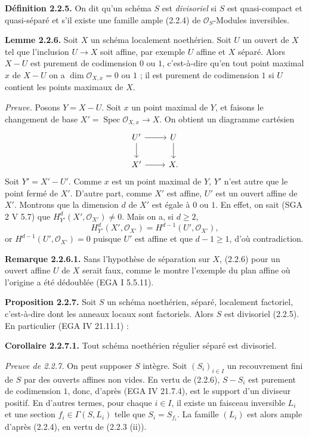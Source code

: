 \documentclass[11pt]{article}
\begin{document}
\textbf{Définition 2.2.5.} On dit qu'un schéma $S$ est \emph{divisoriel} si $S$ est quasi-compact et quasi-séparé et s'il existe une famille ample (2.2.4) de $\mathcal O_S$-Modules inversibles.

\textbf{Lemme 2.2.6.} Soit $X$ un schéma localement noethérien. Soit $U$ un ouvert de $X$ tel que l'inclusion $U\to X$ soit affine, par exemple $U$ affine et $X$ séparé. Alors $X-U$ est purement de codimension $0$ ou $1$, c'est-à-dire qu'en tout point maximal $x$ de $X-U$ on a $\dim\mathcal O_{X,x}=0$ ou $1$ ; il est purement de codimension $1$ si $U$ contient les points maximaux de $X$.

\emph{Preuve.} Posons $Y=X-U$. Soit $x$ un point maximal de $Y$, et faisons le changement de base $X'=\operatorname{Spec}\mathcal O_{X,x}\to X$. On obtient un diagramme cartésien
\[
\begin{tikzcd}
U' \arrow[r] \arrow[d] & U \arrow[d] \\
X' \arrow[r] & X .
\end{tikzcd}
\]
Soit $Y'=X'-U'$. Comme $x$ est un point maximal de $Y$, $Y'$ n'est autre que le point fermé de $X'$. D'autre part, comme $X'$ est affine, $U'$ est un ouvert affine de $X'$. Montrons que la dimension $d$ de $X'$ est égale à $0$ ou $1$. En effet, on sait (SGA 2 V 5.7) que $H^d_{Y'}(X',\mathcal O_{X'})\ne0$. Mais on a, si $d\ge2$,
\[
H^d_{Y'}(X',\mathcal O_{X'})=H^{d-1}(U',\mathcal O_{X'}),
\]
or $H^{d-1}(U',\mathcal O_{X'})=0$ puisque $U'$ est affine et que $d-1\ge1$, d'où contradiction.

\textbf{Remarque 2.2.6.1.} Sans l'hypothèse de séparation sur $X$, (2.2.6) pour un ouvert affine $U$ de $X$ serait faux, comme le montre l'exemple du plan affine où l'origine a été dédoublée (EGA I 5.5.11).

\textbf{Proposition 2.2.7.} Soit $S$ un schéma noethérien, séparé, localement factoriel, c'est-à-dire dont les anneaux locaux sont factoriels. Alors $S$ est divisoriel (2.2.5). En particulier (EGA IV 21.11.1) :

\textbf{Corollaire 2.2.7.1.} Tout schéma noethérien régulier séparé est divisoriel.

\emph{Preuve de 2.2.7.} On peut supposer $S$ intègre. Soit $(S_i)_{i\in I}$ un recouvrement fini de $S$ par des ouverts affines non vides. En vertu de (2.2.6), $S-S_i$ est purement de codimension $1$, donc, d'après (EGA IV 21.7.4), est le support d'un diviseur positif. En d'autres termes, pour chaque $i\in I$, il existe un faisceau inversible $L_i$ et une section $f_i\in\Gamma(S,L_i)$ telle que $S_i=S_{f_i}$. La famille $(L_i)$ est alors ample d'après (2.2.4), en vertu de (2.2.3 (ii)).
\end{document}
